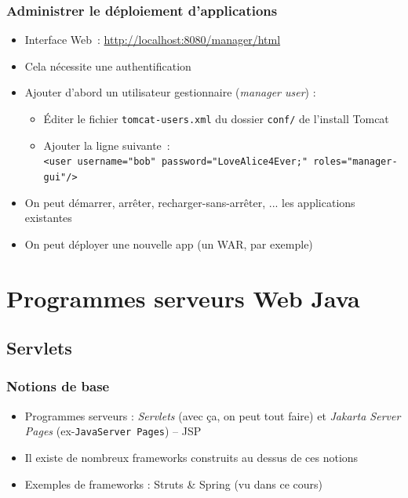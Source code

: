 \documentclass{beamer}
\begin{document}
\begin{frame}
  \frametitle{Administrer le déploiement d'applications}
  \begin{itemize}
  \item Interface Web~: \url{http://localhost:8080/manager/html}
  \item Cela nécessite une authentification
  \item Ajouter d'abord un utilisateur gestionnaire (\textit{manager user}) :
    \begin{itemize}
    \item Éditer le fichier \texttt{tomcat-users.xml} du dossier
      \texttt{conf/} de l'install Tomcat
    \item Ajouter la ligne suivante~:\\
      \texttt{<user username="bob" password="LoveAlice4Ever;" roles="manager-gui"/>}
    \end{itemize}
  \item On peut démarrer, arrêter, recharger-sans-arrêter, ... les
    applications existantes
  \item On peut déployer une nouvelle app (un WAR, par exemple)
  \end{itemize}
\end{frame}

\section{Programmes serveurs Web Java}

\subsection{Servlets}
\begin{frame}
  \frametitle{Notions de base}
  \begin{itemize}
  \item Programmes serveurs : \textit{Servlets} (avec ça, on peut tout faire) et \textit{Jakarta Server Pages} (ex-\texttt{JavaServer Pages}) -- JSP
  \item Il existe de nombreux frameworks construits au dessus de ces notions
  \item Exemples de frameworks : Struts \& Spring (vu dans ce cours)
  \end{itemize}
\end{frame}
\end{document}
